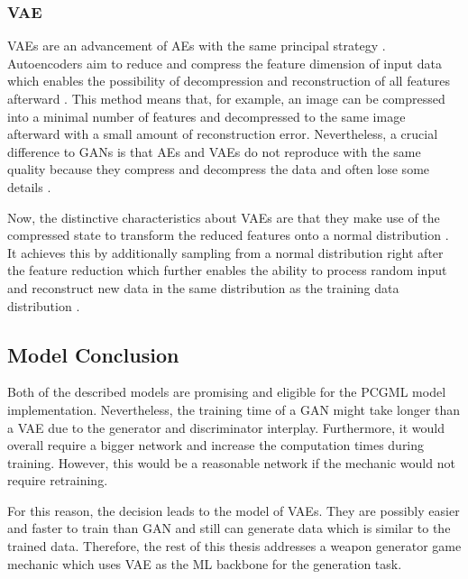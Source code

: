 \documentclass[MGS,Master,english]{twbook}%
\begin{document}
\subsubsection{\acl{VAE}}
\acp{VAE} are an advancement of \acp{AE} with the same principal strategy \cite{ml::vae::tutorial}. Autoencoders aim to reduce and compress the feature dimension of input data which enables the possibility of decompression and reconstruction of all features afterward \cite{ml::book::nnProgrammingTF}. This method means that, for example, an image can be compressed into a minimal number of features and decompressed to the same image afterward with a small amount of reconstruction error. Nevertheless, a crucial difference to \acp{GAN} is that \acp{AE} and \acp{VAE} do not reproduce with the same quality because they compress and decompress the data and often lose some details \cite{ml::book::nnProgrammingTF}. 

Now, the distinctive characteristics about \acp{VAE} are that they make use of the compressed state to transform the reduced features onto a normal distribution \cite{ml::vae::tutorial}. It achieves this by additionally sampling from a normal distribution right after the feature reduction which further enables the ability to process random input and reconstruct new data in the same distribution as the training data distribution \cite{ml::vae::tutorial}.

\subsection{Model Conclusion}
Both of the described models are promising and eligible for the PCGML model implementation. Nevertheless, the training time of a \ac{GAN} might take longer than a \ac{VAE} due to the generator and discriminator interplay. Furthermore, it would overall require a bigger network and increase the computation times during training. However, this would be a reasonable network if the mechanic would not require retraining.

For this reason, the decision leads to the model of \acp{VAE}. They are possibly easier and faster to train than \ac{GAN} and still can generate data which is similar to the trained data. Therefore, the rest of this thesis addresses a weapon generator game mechanic which uses \ac{VAE} as the ML backbone for the generation task.
\end{document}
